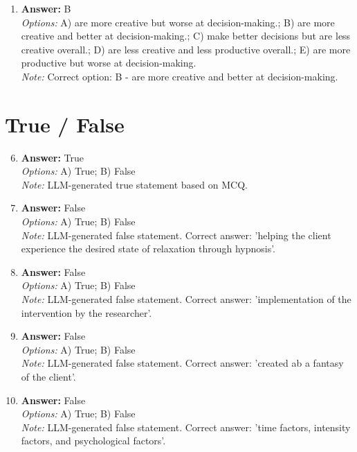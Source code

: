 \documentclass[12pt]{article}
\begin{document}
\begin{enumerate}[label=\arabic*.]
\\ \textit{Note:} Correct option: B - a behavior that occurs frequently.
\item \textbf{Answer:} B
\\ \textit{Options:} A) are more creative but worse at decision-making.; B) are more creative and better at decision-making.; C) make better decisions but are less creative overall.; D) are less creative and less productive overall.; E) are more productive but worse at decision-making.
\\ \textit{Note:} Correct option: B - are more creative and better at decision-making.
\end{enumerate}

\section*{True / False}
\begin{enumerate}[label=\arabic*.]
\setcounter{enumi}{5}
\item \textbf{Answer:} True
\\ \textit{Options:} A) True; B) False
\\ \textit{Note:} LLM-generated true statement based on MCQ.
\item \textbf{Answer:} False
\\ \textit{Options:} A) True; B) False
\\ \textit{Note:} LLM-generated false statement. Correct answer: 'helping the client experience the desired state of relaxation through hypnosis'.
\item \textbf{Answer:} False
\\ \textit{Options:} A) True; B) False
\\ \textit{Note:} LLM-generated false statement. Correct answer: 'implementation of the intervention by the researcher'.
\item \textbf{Answer:} False
\\ \textit{Options:} A) True; B) False
\\ \textit{Note:} LLM-generated false statement. Correct answer: 'created ab a fantasy of the client'.
\item \textbf{Answer:} False
\\ \textit{Options:} A) True; B) False
\\ \textit{Note:} LLM-generated false statement. Correct answer: 'time factors, intensity factors, and psychological factors'.
\end{enumerate}
\end{document}
